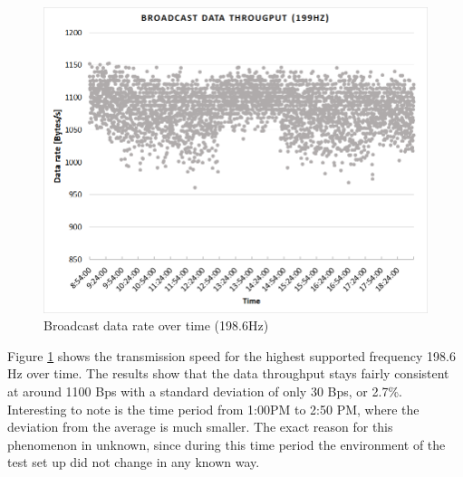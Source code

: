 \begin{description}
	\begin{figure}[H]
		\centering
		\includegraphics[scale=0.5]{content/images/exp1_long.png}
		\caption{Broadcast data rate over time (198.6Hz)}\label{fig:exp1long}
	\end{figure}
	Figure \ref{fig:exp1long} shows the transmission speed for the highest supported frequency 198.6 Hz over time. The results show that the data throughput stays fairly consistent at around 1100 Bps with a standard deviation of only 30 Bps, or 2.7\%. Interesting to note is the time period from 1:00PM to 2:50 PM, where the deviation from the average is much smaller. The exact reason for this phenomenon in unknown, since during this time period the environment of the test set up did not change in any known way.
\end{description}
\newpage

